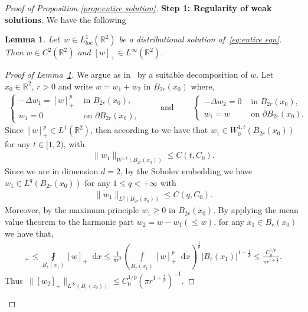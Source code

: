 \documentclass[10pt]{amsart}
\newcommand{\parenthesis}[1]{\left(#1\right)} %
\newcommand{\R}{\mathbb{R}}
\newcommand{\dd}{\mathop{}\!\mathrm{d}}
\def\R{\mathbb{R}}
\newtheorem{lemma}[theorem]{Lemma}
\begin{document}
    \begin{proof}[Proof of Proposition \ref{prop:entire solution}]

    {\bf Step 1: Regularity of weak solutions}. We have the following
    \begin{lemma}\label{lemma:regularity of entire solution}
        Let~$w\in L^1_{loc}(\R^2)$ be a distributional solution of~\eqref{eq:entire eqn}.
        Then $w\in C^2(\R^2)$ and $[w]_+\in L^\infty(\R^2)$.
    \end{lemma}

    \begin{proof}[Proof of Lemma~\ref{lemma:regularity of entire solution}]
        We argue as in~\cite{bm} by a suitable decomposition of $w$. Let $x_0\in\R^2$, $r>0$
        and write $w=w_1+w_2$ in $B_{2r}(x_0)$ where,
        \begin{align*}
            \begin{cases}
                -\Delta w_1=[w]_+^p & \mbox{ in } B_{2r}(x_0), \\
                w_1=0 & \mbox{ on } \partial B_{2r}(x_0),
            \end{cases}
            \qquad \mbox{ and } \qquad
            \begin{cases}
                -\Delta w_2= 0 & \mbox{ in } B_{2r}(x_0), \\
                w_1=w & \mbox{ on } \partial B_{2r}(x_0).
            \end{cases}
        \end{align*}
        Since $[w]_+^p\in L^1(\R^2)$, then according to \cite{stam} we have that $w_1\in W_0^{1,t}(B_{2r}(x_0))$ for any $t\in [1,2)$, with
        \begin{align*}
            \|w_1\|_{W^{1,t}(B_{2r}(x_0))} \leq C(t, C_0).
        \end{align*}
        Since we are in dimension $d=2$, by the Sobolev embedding we have $w_1\in L^q(B_{2r}(x_0))$ for any $1\leq q<+\infty$ with
        \begin{align*}
            \|w_1\|_{L^q(B_{2r}(x_0))}\leq C(q, C_0).
        \end{align*}
        Moreover, by the maximum principle $w_1\geq 0$ in $B_{2r}(x_0)$. By applying the mean value theorem to the harmonic part
        $w_2=w-w_1(\leq w)$, for any $x_1\in B_r(x_0)$ we have that,
        \begin{align*}
            [w_2(x_1)]_+ \leq \fint\limits_{B_{r}(x_1)} [w]_+ \dd{x} \leq \frac{1}{\pi r^2}\parenthesis{\int\limits_{B_{r}(x_1)} [w]_+^p\dd{x}}^{\frac{1}{p}} |B_r(x_1)|^{1-\frac{1}{p}}
            \leq \frac{ C_0^{1/p}}{\pi r^{1+\frac{1}{p}}}.
        \end{align*}
        Thus~$\|[w_2]_+\|_{L^\infty(B_r(x_0))} \leq  C_0^{1/p}(\pi r^{1+\frac{1}{p}})^{-1}$.


\end{proof}
\end{proof}
\end{document}
